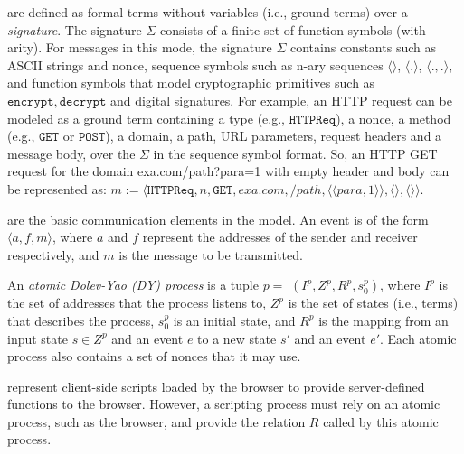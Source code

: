  are defined as formal terms without variables (i.e., ground terms) over a {\em signature}. %
The signature $\Sigma$ consists of a finite set of function symbols (with arity). For messages in this mode, the signature $\Sigma$ contains constants such as ASCII strings and nonce, sequence symbols such as n-ary sequences $\langle \rangle$, $\langle . \rangle$, $\langle . ,. \rangle$, and function symbols that model cryptographic primitives such as $\mathtt{encrypt}, \mathtt{decrypt}$ and digital signatures. For example, an HTTP request can be modeled as a ground term containing a type (e.g., $\mathtt{HTTPReq}$), a nonce, a method (e.g., $\mathtt{GET}$ or $\mathtt{POST}$), a domain, a path, URL parameters, request headers and a message body, over the $\Sigma$ in the sequence symbol format. So,
an HTTP GET request for the domain {\sf exa.com/path?para=1} with empty header and body can be represented as: $m:=\langle\mathtt{HTTPReq},n,\mathtt{GET},exa.com,/path,\langle \langle para, 1\rangle \rangle ,\langle \rangle,\langle \rangle \rangle$.

 are the basic communication elements in the model. An event is of the form $\langle a, f, m \rangle$, where $a$ and $f$ represent the addresses of the sender and receiver respectively, and $m$ is the message to be transmitted.

 An {\em atomic Dolev-Yao (DY) process} is a tuple $p=$ $(I^p, Z^p, R^p,s_0^p )$, where $I^p$ is the set of addresses that the process listens to, $Z^p$ is the set of states (i.e., terms) that describes the process, $s_0^p$ is an initial state, and $R^p$ is the mapping from an input state $s \in Z^p$ and an event $e$ to a new state $s'$ and an event $e'$. %
Each atomic process also contains a set of nonces that it may use.

 represent client-side scripts loaded by the browser to provide server-defined functions to the browser. However, a scripting process must rely on an atomic process, such as the browser, and provide the relation $R$ called by this atomic process.

